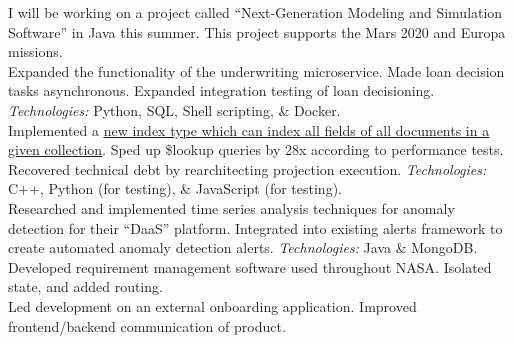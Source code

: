 \documentclass[11pt,letter,sans]{moderncv}
\begin{document}
I will be working on a project called ``Next-Generation Modeling and Simulation Software'' in Java this summer. This project supports the Mars 2020 and Europa missions.
\\
Expanded the functionality of the underwriting microservice.
Made loan decision tasks asynchronous.
Expanded integration testing of loan decisioning.
\textit{Technologies:} Python, SQL, Shell scripting, \& Docker.
\\
Implemented a \href{https://docs.mongodb.com/manual/core/index-wildcard/}{\underline{new index type which can index all fields of all documents in a given collection}}.
Sped up \$lookup queries by 28x according to performance tests.
Recovered technical debt by rearchitecting projection execution.
\textit{Technologies:} C++, Python (for testing), \& JavaScript (for testing).
\\
Researched and implemented time series analysis techniques for anomaly detection for their ``DaaS'' platform. Integrated into existing alerts framework to create automated anomaly detection alerts.
\textit{Technologies:} Java \& MongoDB.
\\
Developed requirement management software used throughout NASA.
Isolated state, and added routing.
\\
Led development on an external onboarding application.
Improved frontend/backend communication of product.
\end{document}
